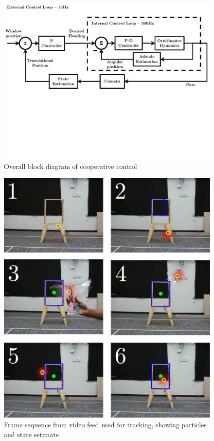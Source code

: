 \documentclass[letterpaper, 10 pt, conference]{ieeeconf}
\begin{document}
\begin{figure}[tb]
\centering
\includegraphics[width=\linewidth]{figures/block_diagrams.pdf}
\caption{Overall block diagram of cooperative control}
\label{fig:block_diagram}
\end{figure}

\begin{figure}[tb]
\centering
\includegraphics[width=\linewidth]{figures/pf_screencap.pdf}
\caption{Frame sequence from video feed used for tracking, showing particles and state estimate}
\label{fig:pf_screencap}
\end{figure}
\end{document}
